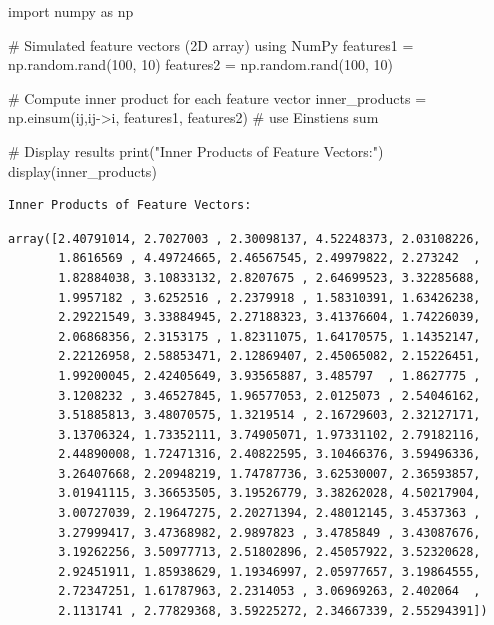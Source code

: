 \documentclass[
  letterpaper,
  DIV=11,
  numbers=noendperiod]{scrreprt}
\newenvironment{Shaded}{\begin{snugshade}}{\end{snugshade}}
\newcommand{\BuiltInTok}[1]{\textcolor[rgb]{0.00,0.23,0.31}{#1}}
\newcommand{\CommentTok}[1]{\textcolor[rgb]{0.37,0.37,0.37}{#1}}
\newcommand{\DecValTok}[1]{\textcolor[rgb]{0.68,0.00,0.00}{#1}}
\newcommand{\ImportTok}[1]{\textcolor[rgb]{0.00,0.46,0.62}{#1}}
\newcommand{\NormalTok}[1]{\textcolor[rgb]{0.00,0.23,0.31}{#1}}
\newcommand{\OperatorTok}[1]{\textcolor[rgb]{0.37,0.37,0.37}{#1}}
\newcommand{\StringTok}[1]{\textcolor[rgb]{0.13,0.47,0.30}{#1}}
\theoremstyle{plain}
\theoremstyle{definition}
\theoremstyle{remark}
\begin{document}
\begin{Shaded}
\begin{Highlighting}[]
\ImportTok{import}\NormalTok{ numpy }\ImportTok{as}\NormalTok{ np}

\CommentTok{\# Simulated feature vectors (2D array) using NumPy}
\NormalTok{features1 }\OperatorTok{=}\NormalTok{ np.random.rand(}\DecValTok{100}\NormalTok{, }\DecValTok{10}\NormalTok{)}
\NormalTok{features2 }\OperatorTok{=}\NormalTok{ np.random.rand(}\DecValTok{100}\NormalTok{, }\DecValTok{10}\NormalTok{)}

\CommentTok{\# Compute inner product for each feature vector}
\NormalTok{inner\_products }\OperatorTok{=}\NormalTok{ np.einsum(}\StringTok{\textquotesingle{}ij,ij{-}\textgreater{}i\textquotesingle{}}\NormalTok{, features1, features2) }\CommentTok{\# use Einstien\textquotesingle{}s sum}

\CommentTok{\# Display results}
\BuiltInTok{print}\NormalTok{(}\StringTok{"Inner Products of Feature Vectors:"}\NormalTok{)}
\NormalTok{display(inner\_products)}
\end{Highlighting}
\end{Shaded}

\begin{verbatim}
Inner Products of Feature Vectors:
\end{verbatim}

\begin{verbatim}
array([2.40791014, 2.7027003 , 2.30098137, 4.52248373, 2.03108226,
       1.8616569 , 4.49724665, 2.46567545, 2.49979822, 2.273242  ,
       1.82884038, 3.10833132, 2.8207675 , 2.64699523, 3.32285688,
       1.9957182 , 3.6252516 , 2.2379918 , 1.58310391, 1.63426238,
       2.29221549, 3.33884945, 2.27188323, 3.41376604, 1.74226039,
       2.06868356, 2.3153175 , 1.82311075, 1.64170575, 1.14352147,
       2.22126958, 2.58853471, 2.12869407, 2.45065082, 2.15226451,
       1.99200045, 2.42405649, 3.93565887, 3.485797  , 1.8627775 ,
       3.1208232 , 3.46527845, 1.96577053, 2.0125073 , 2.54046162,
       3.51885813, 3.48070575, 1.3219514 , 2.16729603, 2.32127171,
       3.13706324, 1.73352111, 3.74905071, 1.97331102, 2.79182116,
       2.44890008, 1.72471316, 2.40822595, 3.10466376, 3.59496336,
       3.26407668, 2.20948219, 1.74787736, 3.62530007, 2.36593857,
       3.01941115, 3.36653505, 3.19526779, 3.38262028, 4.50217904,
       3.00727039, 2.19647275, 2.20271394, 2.48012145, 3.4537363 ,
       3.27999417, 3.47368982, 2.9897823 , 3.4785849 , 3.43087676,
       3.19262256, 3.50977713, 2.51802896, 2.45057922, 3.52320628,
       2.92451911, 1.85938629, 1.19346997, 2.05977657, 3.19864555,
       2.72347251, 1.61787963, 2.2314053 , 3.06969263, 2.402064  ,
       2.1131741 , 2.77829368, 3.59225272, 2.34667339, 2.55294391])
\end{verbatim}
\end{document}
